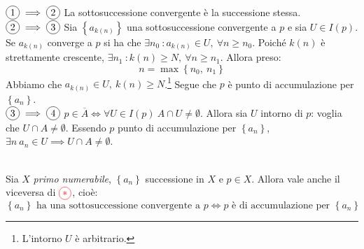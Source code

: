 \begin{demonstration}~{}\\
$\circled{1}\implies\circled{2}$ La sottosuccessione convergente è la successione stessa.\\
$\circled{2}\implies\circled{3}$ Sia $\left\{a_{k\left(n\right)}\right\}$ una sottosuccessione convergente a $p$ e sia $U\in I\left(p\right)$. \\
Se $a_{k\left(n\right)}$ converge a $p$ si ha che $\exists n_0\ \colon a_{k\left(n\right)}\in U,\ \forall n\geq n_0$. Poiché $k\left(n\right)$ è strettamente crescente, $\exists n_1\ \colon k\left(n\right)\geq N,\ \forall n\geq n_1$. Allora preso:
\begin{equation*}
	n=\max\left\{n_0,\ n_1\right\}
\end{equation*}
Abbiamo che $a_{k\left(n\right)}\in U,\ k\left(n\right)\geq N$.\footnote{L'intorno $U$ è arbitrario.} Segue che $p$ è punto di accumulazione per $\left\{a_n\right\}$.\\
$\circled{3}\implies\circled{4}$ $p\in \overline{A}\iff \forall U\in I\left(p\right)\ A\cap U\neq \emptyset$. Allora sia $U$ intorno di $p$: voglia che $U\cap A\neq \emptyset$. Essendo $p$ punto di accumulazione per $\left\{a_n\right\}$, $\exists n\ a_n\in U\implies U\cap A\neq \emptyset$.
\end{demonstration}
\begin{lemming}~{}\label{primonumesucc}\\
Sia $X$ \textit{primo numerabile}, $\left\{a_n\right\}$ successione in $X$ e $p\in X$. Allora vale anche il viceversa di $\textcolor{red}{\circled{\ast}}$, cioè:
\begin{equation}
	\left\{a_n\right\}\text{ ha una sottosuccessione convergente a }p\iff p\text{ è di accumulazione per }\left\{a_n\right\}
\end{equation}
\end{lemming}
